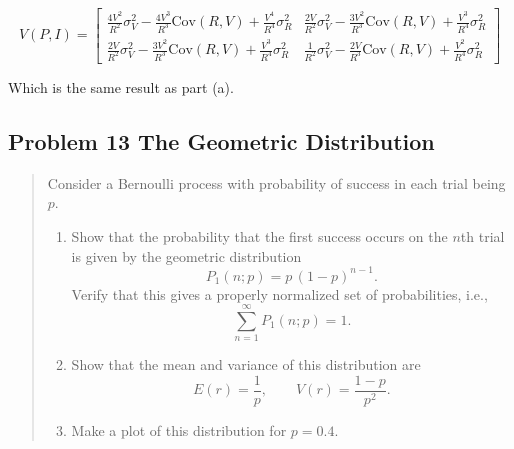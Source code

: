 \documentclass[10pt]{article}
\begin{document}
\begin{enumerate}[label=(\alph*)]
	      \[ \boxed{V(P,I) = \begin{bmatrix} \frac{4V^2}{R^2}\sigma_V^2 - \frac{4V^3}{R^3}\text{Cov}(R,V) + \frac{V^4}{R^4}\sigma_R^2 & \frac{2V}{R^2}\sigma_V^2 - \frac{3V^2}{R^3}\text{Cov}(R,V) + \frac{V^3}{R^4}\sigma_R^2 \\ \frac{2V}{R^2}\sigma_V^2 - \frac{3V^2}{R^3}\text{Cov}(R,V)  + \frac{V^3}{R^4}\sigma_R^2  & \frac{1}{R^2}\sigma_V^2 - \frac{2V}{R^3}\text{Cov}(R,V) + \frac{V^2}{R^4}\sigma_R^2 \end{bmatrix} }\]

	      Which is the same result as part (a).
\end{enumerate}

\subsection*{Problem 13 The Geometric Distribution}
\begin{quote}
	Consider a Bernoulli process with probability of success in each trial being $p$.
	\begin{enumerate}[label=(\alph*)]
		\item Show that the probability that the first success occurs on the $n$th trial is given by the geometric distribution
		      \[
			      P_1(n;p) = p\,(1-p)^{n-1}.
		      \]
		      Verify that this gives a properly normalized set of probabilities, i.e.,
		      \[
			      \sum_{n=1}^{\infty} P_1(n;p) = 1.
		      \]
		\item Show that the mean and variance of this distribution are
		      \[
			      E(r)=\frac{1}{p}, \qquad V(r)=\frac{1-p}{p^2}.
		      \]
		\item Make a plot of this distribution for $p=0.4$.
	\end{enumerate}
\end{quote}

\divider
\end{document}
